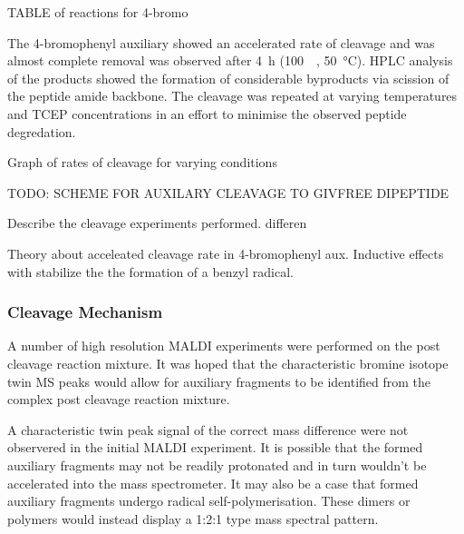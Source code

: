     TABLE of reactions for 4-bromo

    The 4-bromophenyl auxiliary  showed an accelerated rate of cleavage and was almost complete removal was observed  after \SI{4}{\hour} (\SI{100}{\milli\molar}, \SI{50}{\celsius}). HPLC analysis of the products showed the formation of considerable byproducts via scission of the peptide amide backbone. The cleavage was repeated at varying temperatures and TCEP concentrations in an effort to minimise the observed peptide degredation.

    Graph of rates of cleavage for varying conditions

    TODO: SCHEME FOR AUXILARY CLEAVAGE TO GIVFREE DIPEPTIDE

    Describe the cleavage experiments performed. differen

    Theory about acceleated cleavage rate in 4-bromophenyl aux. Inductive effects with stabilize the the formation of a benzyl radical.

    \subsubsection{Cleavage Mechanism}

    A number of high resolution MALDI experiments were performed on the  post cleavage reaction mixture. It was hoped that the characteristic bromine isotope twin MS peaks would allow for  auxiliary fragments to be identified from the complex post cleavage reaction mixture.

    A characteristic twin peak signal of the correct mass difference were not observered in the initial MALDI experiment. It is possible that the formed auxiliary fragments may not be readily protonated and in turn wouldn't be accelerated into the mass spectrometer. It may also be a case that formed  auxiliary fragments undergo radical self-polymerisation. These dimers or polymers would instead display a 1:2:1 type mass spectral pattern.

